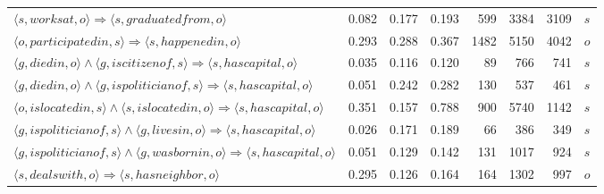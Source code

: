 \begin{tabular}{lrrrrrrl}
                                                $\langle s, worksat, o \rangle \Rightarrow \langle s, graduatedfrom , o \rangle$ &          0.082 &              0.177 &              0.193 &                             599 &                        3384 &                            3109 &        $s$ \\
                                            $\langle o, participatedin, s \rangle \Rightarrow \langle s, happenedin , o \rangle$ &          0.293 &              0.288 &              0.367 &                            1482 &                        5150 &                            4042 &        $o$ \\
           $\langle g, diedin, o \rangle \wedge \langle g, iscitizenof, s \rangle \Rightarrow \langle s, hascapital , o \rangle$ &          0.035 &              0.116 &              0.120 &                              89 &                         766 &                             741 &        $s$ \\
        $\langle g, diedin, o \rangle \wedge \langle g, ispoliticianof, s \rangle \Rightarrow \langle s, hascapital , o \rangle$ &          0.051 &              0.242 &              0.282 &                             130 &                         537 &                             461 &        $s$ \\
      $\langle o, islocatedin, s \rangle \wedge \langle s, islocatedin, o \rangle \Rightarrow \langle s, hascapital , o \rangle$ &          0.351 &              0.157 &              0.788 &                             900 &                        5740 &                            1142 &        $s$ \\
       $\langle g, ispoliticianof, s \rangle \wedge \langle g, livesin, o \rangle \Rightarrow \langle s, hascapital , o \rangle$ &          0.026 &              0.171 &              0.189 &                              66 &                         386 &                             349 &        $s$ \\
     $\langle g, ispoliticianof, s \rangle \wedge \langle g, wasbornin, o \rangle \Rightarrow \langle s, hascapital , o \rangle$ &          0.051 &              0.129 &              0.142 &                             131 &                        1017 &                             924 &        $s$ \\
                                                $\langle s, dealswith, o \rangle \Rightarrow \langle s, hasneighbor , o \rangle$ &          0.295 &              0.126 &              0.164 &                             164 &                        1302 &                             997 &        $o$ \\

\end{tabular}
